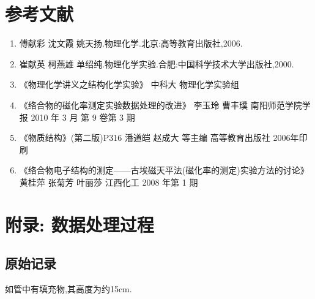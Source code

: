 \documentclass[11pt]{report}
\begin{document}
\part{参考文献}
\label{sec:org7a2601e}
\begin{enumerate}
\item 傅献彩 沈文霞 姚天扬.物理化学.北京:高等教育出版社,2006.
\item 崔献英 柯燕雄 单绍纯.物理化学实验.合肥:中国科学技术大学出版社,2000.
\item 《物理化学讲义之结构化学实验》 中科大 物理化学实验组
\item 《络合物的磁化率测定实验数据处理的改进》 李玉玲 曹丰璞 南阳师范学院学报 2010 年 3 月 第 9 卷第 3 期
\item 《物质结构》(第二版)P316 潘道皑 赵成大 等主编 高等教育出版社 2006年印刷
\item 《络合物电子结构的测定——古埃磁天平法(磁化率的测定)实验方法的讨论》 黄桂萍 张菊芳 叶丽莎 江西化工 2008 年第 1 期
\end{enumerate}

\part{附录: 数据处理过程}
\label{sec:orge6dcb51}
\chapter{原始记录}
\label{sec:orgb52bd18}
如管中有填充物,其高度为约15cm.   
\end{document}
